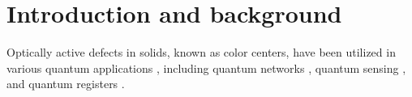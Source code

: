 \documentclass[%
 reprint,
superscriptaddress,
 amsmath,amssymb,
 aps,
]{revtex4-2}
\begin{document}
\maketitle
\section{Introduction and background}
Optically active defects in solids, known as color centers, have been utilized in various quantum applications \cite{awschalom2018quantum}, including quantum networks \cite{pompili2021realization}, quantum sensing \cite{degen2017quantum, meinel2023high}, and quantum registers \cite{bradley2019ten, vorobyov2021quantum, hesselmeier2024qudit, hesselmeier2024high, reiner2024high}. 
\end{document}
